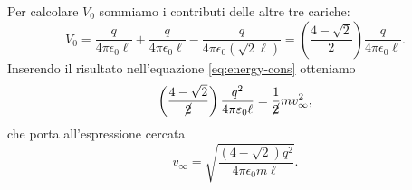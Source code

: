 \documentclass[10pt]{gulartcl}
\begin{document}
\begin{solution}
Per calcolare $V_{0}$ sommiamo i contributi delle altre tre cariche:
\begin{equation}
    V_0 = \frac{q}{4\pi\epsilon_0 \ell} + \frac{q}{4\pi\epsilon_0 \ell} -
    \frac{q}{4\pi\epsilon_0 (\sqrt{2}\ell)} = \left(\frac{4 - \sqrt{2}}{2}\right)
    \frac{q}{4\pi\epsilon_0 \ell}.
\end{equation}
Inserendo il risultato nell’equazione \eqref{eq:energy-cons} otteniamo
\begin{equation}
    \left(\frac{4 - \sqrt{2}}{\cancel{2}}\right) \frac{q^{2}}{4 \pi \epsilon_0 \ell}
    = \frac{1}{\cancel{2}} m v_{\infty}^{2},
\end{equation}
che porta all’espressione cercata
\begin{equation}
    v_{\infty} = \sqrt{\frac{(4 - \sqrt{2}) q^{2}}{4\pi\epsilon_0 m
    \ell}}.
\end{equation}
\end{solution}
\end{document}
